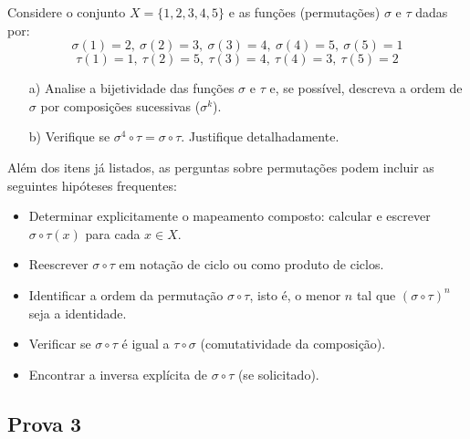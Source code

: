     Considere o conjunto $X = \{1, 2, 3, 4, 5\}$ e as funções (permutações) $\sigma$ e $\tau$ dadas por:
    \[
    \sigma(1) = 2,\ \sigma(2) = 3,\ \sigma(3) = 4,\ \sigma(4) = 5,\ \sigma(5) = 1
    \]
    \[
    \tau(1) = 1,\ \tau(2) = 5,\ \tau(3) = 4,\ \tau(4) = 3,\ \tau(5) = 2
    \]

    \begin{enumerate}
        \item[a)] Analise a bijetividade das funções $\sigma$ e $\tau$ e, se possível, descreva a ordem de $\sigma$ por composições sucessivas ($\sigma^k$).
        \item[b)] Verifique se $\sigma^4 \circ \tau = \sigma \circ \tau$. Justifique detalhadamente.
    \end{enumerate}

    Além dos itens já listados, as perguntas sobre permutações podem incluir as seguintes hipóteses frequentes:

    \begin{itemize}
        \item Determinar explicitamente o mapeamento composto: calcular e escrever $\sigma \circ \tau(x)$ para cada $x \in X$.
        \item Reescrever $\sigma \circ \tau$ em notação de ciclo ou como produto de ciclos.
        \item Identificar a ordem da permutação $\sigma \circ \tau$, isto é, o menor $n$ tal que $(\sigma \circ \tau)^n$ seja a identidade.
        \item Verificar se $\sigma \circ \tau$ é igual a $\tau \circ \sigma$ (comutatividade da composição).
        \item Encontrar a inversa explícita de $\sigma \circ \tau$ (se solicitado).
    \end{itemize}

\subsection{Prova 3}
